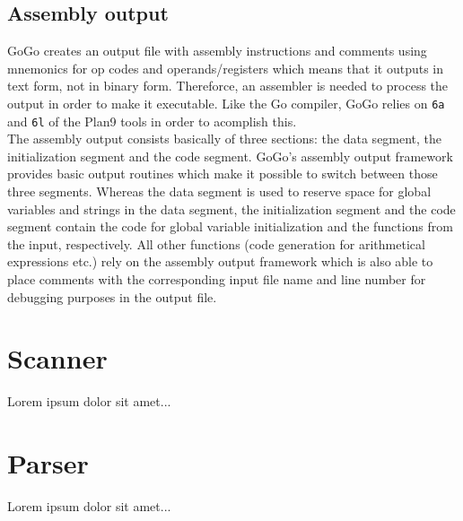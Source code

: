 \documentclass[a4paper]{scrreprt}
\begin{document}
    \section{Assembly output}
      GoGo creates an output file with assembly instructions and comments using mnemonics for op codes and operands/registers which means that it outputs in text form, not in binary form. Thereforce, an assembler is needed to process the output in order to make it executable. Like the Go compiler, GoGo relies on \texttt{6a} and \texttt{6l} of the Plan9 tools in order to acomplish this\cite{pik00}.\\
      The assembly output consists basically of three sections: the data segment, the initialization segment and the code segment. GoGo's assembly output framework provides basic output routines which make it possible to switch between those three segments. Whereas the data segment is used to reserve space for global variables and strings in the data segment, the initialization segment and the code segment contain the code for global variable initialization and the functions from the input, respectively. All other functions (code generation for arithmetical expressions etc.) rely on the assembly output framework which is also able to place comments with the corresponding input file name and line number for debugging purposes in the output file.

  \chapter{Scanner}
    Lorem ipsum dolor sit amet...
    
  \chapter{Parser}
    Lorem ipsum dolor sit amet...
\end{document}
